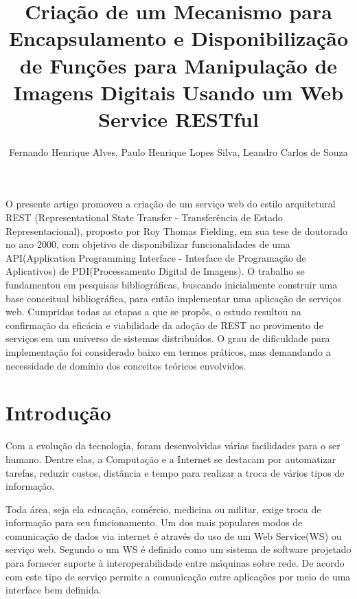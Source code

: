 \documentclass[12pt]{article}
\title{Criação de um Mecanismo para Encapsulamento e Disponibilização de Funções para Manipulação de Imagens Digitais Usando um Web Service RESTful}
\author{Fernando Henrique Alves\inst{1}, Paulo Henrique Lopes Silva\inst{1}, Leandro Carlos de Souza\inst{1}}
\begin{document}
 

\maketitle

\begin{abstract}
  
\end{abstract}

\begin{resumo} 
  O presente artigo promoveu a criação de um serviço web do estilo arquitetural REST (Representational State Transfer - Transferência de Estado Representacional), proposto por Roy Thomas Fielding, em sua tese de doutorado no ano 2000, com objetivo de disponibilizar funcionalidades de uma API(Application Programming Interface - Interface de Programação de Aplicativos) de PDI(Processamento Digital de Imagens).
  O trabalho se fundamentou em pesquisas bibliográficas, buscando inicialmente construir uma base conceitual bibliográfica, para então implementar uma aplicação de serviços web.
  Cumpridas todas as etapas a que se propôs, o estudo resultou na confirmação da eficácia e viabilidade da adoção de REST no provimento de serviços em um universo de sistemas distribuídos. O grau de dificuldade para implementação foi considerado baixo em termos práticos, mas demandando a necessidade de domínio dos conceitos teóricos envolvidos.
  
  
\end{resumo}


\section{Introdução}

Com a evolução da tecnologia, foram desenvolvidas várias facilidades para o ser humano. 
Dentre elas, a Computação e a Internet se destacam por automatizar tarefas, reduzir
custos, distância e tempo para realizar a troca de vários tipos de informação. 

Toda área, seja ela educação, comércio, medicina ou militar, exige troca de informação para seu funcionamento. 
Um dos mais populares modos de comunicação de dados via internet é através do uso de um Web Service(WS) ou serviço web.
Segundo o \cite{w3c1} um WS é definido como um sistema de software projetado para fornecer suporte à interoperabilidade entre máquinas sobre rede.
De acordo com  \cite{cerami:02} este tipo
de serviço permite a comunicação entre aplicações por meio de uma interface bem
definida.
\end{document}
